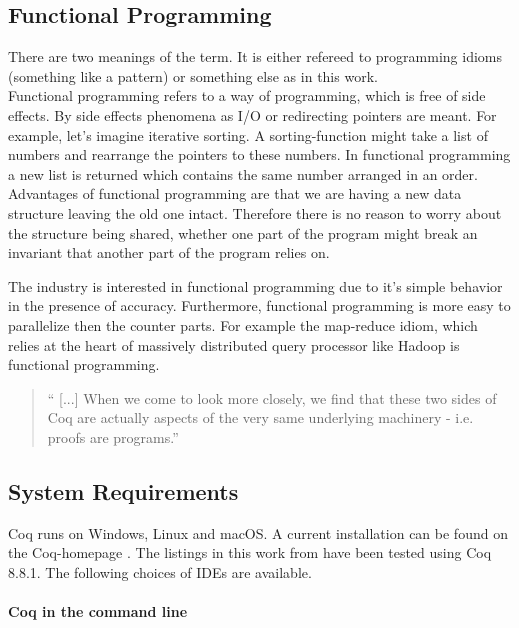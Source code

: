 \subsection{Functional Programming}

There are two meanings of the term. 
It is either refereed to programming idioms (something like a pattern) or something else as in this work.\\

Functional programming refers to a way of programming, which is free of side effects.
By side effects phenomena as I/O or redirecting pointers are meant. 
For example, let's imagine iterative sorting. 
A sorting-function might take a list of numbers and rearrange the pointers to these numbers.
In functional programming a new list is returned which contains the same number arranged in an order.\\ 
Advantages of functional programming are that we are having a new data structure leaving the old one intact. 
Therefore there is no reason to worry about the structure being shared, whether one part of the program might break an invariant that another part of the program relies on.\par
The industry is interested in functional programming due to it's simple behavior in the presence of accuracy.
Furthermore, functional programming is more easy to parallelize then the counter parts.
For example the map-reduce idiom, which relies at the heart of massively distributed query processor like \gls{Hadoop} is functional programming. 

\begin{quote}
`` [...] When we come to look more closely, we find that these two sides of Coq are actually aspects of the very same underlying machinery - i.e. proofs are programs.'' 
\end{quote}




\subsection{System Requirements}

Coq runs on Windows, Linux and macOS.
A current installation can be found on the Coq-homepage \cite{Coq}. 
The listings in this work from \cite{PACGGHSY} have been tested using Coq 8.8.1.
The following choices of IDEs are available. 


\paragraph{Coq in the command line}

